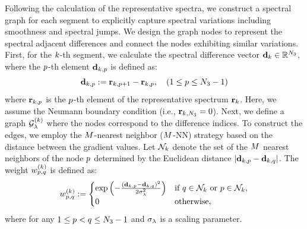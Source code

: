Following the calculation of the representative spectra, we construct a spectral graph for each segment to explicitly capture spectral variations including smoothness and spectral jumps. We design the graph nodes to represent the spectral adjacent differences and connect the nodes exhibiting similar variations. First, for the $k$-th segment, we calculate the spectral difference vector $\mathbf{d}_{k} \in \mathbb{R}^{N_{3}}$, where the $p$-th element $\mathbf{d}_{k, p}$ is defined as:
\begin{equation}
    \label{eq:SpectralDiffVec}
    \mathbf{d}_{k, p} := \mathbf{r}_{k, p+1} - \mathbf{r}_{k, p}
    , \quad (1 \leq p \leq N_{3} -1)
\end{equation}
where $\mathbf{r}_{k, p}$ is the $p$-th element of the representative spectrum $\mathbf{r}_{k}$. Here, we assume the Neumann boundary condition (i.e., $\mathbf{r}_{k, N_{3}} = 0$). Next, we define a graph $\mathcal{G}_{\lambda}^{(k)}$ where the nodes correspond to the difference indices. To construct the edges, we employ the $M$-nearest neighbor ($M$-NN) strategy based on the distance between the gradient values. Let $\mathcal{N}_{k}$ denote the set of the $M$ nearest neighbors of the node $p$ determined by the Euclidean distance $| \mathbf{d}_{k, p} - \mathbf{d}_{k, q} |$. The weight $w_{p, q}^{(k)}$ is defined as: 
\begin{equation}
    \label{eq:SpectralGraphWeight}
    w_{p, q}^{(k)} :=
    \begin{cases}
        \exp\left( - \frac{(\mathbf{d}_{k, p} - \mathbf{d}_{k, q})^2}{2 \sigma_{\lambda}^{2}} \right) & \text{if } q \in \mathcal{N}_{k} \text{ or } p \in \mathcal{N}_{k}, \\
        0 & \text{otherwise},
    \end{cases}
\end{equation}
where for any $1 \leq p < q \leq N_{3}-1$ and $\sigma_{\lambda}$ is a scaling parameter.

